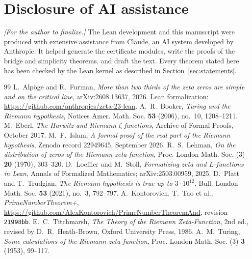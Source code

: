 \documentclass[11pt]{article}
\theoremstyle{definition}
\theoremstyle{remark}
\begin{document}
\section*{Disclosure of AI assistance}
\emph{[For the author to finalize.]} The Lean development and this manuscript were produced with extensive assistance
from Claude, an AI system developed by Anthropic. It helped generate the certificate modules, write the proofs of the
bridge and simplicity theorems, and draft the text. Every theorem stated here has been checked by the Lean kernel as
described in Section~\ref{sec:statements}.

\begin{thebibliography}{99}
 L.~Alpöge and R.~Furman, \emph{More than two thirds of the zeta zeros are simple and on the
  critical line}, arXiv:2608.13637, 2026. Lean formalization: \url{https://github.com/anthropics/zeta-23-lean}.
 A.~R.~Booker, \emph{Turing and the Riemann hypothesis}, Notices Amer. Math. Soc. \textbf{53}
  (2006), no.~10, 1208--1211.
 M.~Eberl, \emph{The Hurwitz and Riemann $\zeta$ functions}, Archive of Formal Proofs, October 2017.
 M.~F.~Islam, \emph{A formal proof of the real part of the Riemann hypothesis}, Zenodo record
  22949645, September 2026.
 R.~S.~Lehman, \emph{On the distribution of zeros of the Riemann zeta-function}, Proc. London Math.
  Soc. (3) \textbf{20} (1970), 303--320.
 D.~Loeffler and M.~Stoll, \emph{Formalizing zeta and $L$-functions in Lean}, Annals of Formalized
  Mathematics; arXiv:2503.00959, 2025.
 D.~Platt and T.~Trudgian, \emph{The Riemann hypothesis is true up to $3\cdot10^{12}$}, Bull.
  London Math. Soc. \textbf{53} (2021), no.~3, 792--797.
 A.~Kontorovich, T.~Tao et al., \emph{PrimeNumberTheorem+},
  \url{https://github.com/AlexKontorovich/PrimeNumberTheoremAnd}, revision \texttt{21998bb}.
 E.~C.~Titchmarsh, \emph{The Theory of the Riemann Zeta-Function}, 2nd ed., revised by
  D.~R.~Heath-Brown, Oxford University Press, 1986.
 A.~M.~Turing, \emph{Some calculations of the Riemann zeta-function}, Proc. London Math. Soc. (3)
  \textbf{3} (1953), 99--117.
\end{thebibliography}
\end{document}
